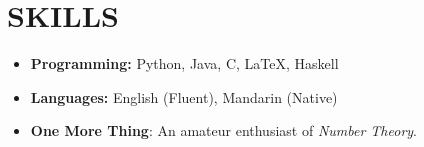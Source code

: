 \section*{SKILLS}
\begin{itemize}[label={}, leftmargin=0em, itemsep=0.5em]
    \item \textbf{Programming:} Python, Java, C, \LaTeX, Haskell
    \item \textbf{Languages:} English (Fluent), Mandarin (Native)
    \item \textbf{One More Thing}: An amateur enthusiast of \emph{Number Theory}.
\end{itemize}
